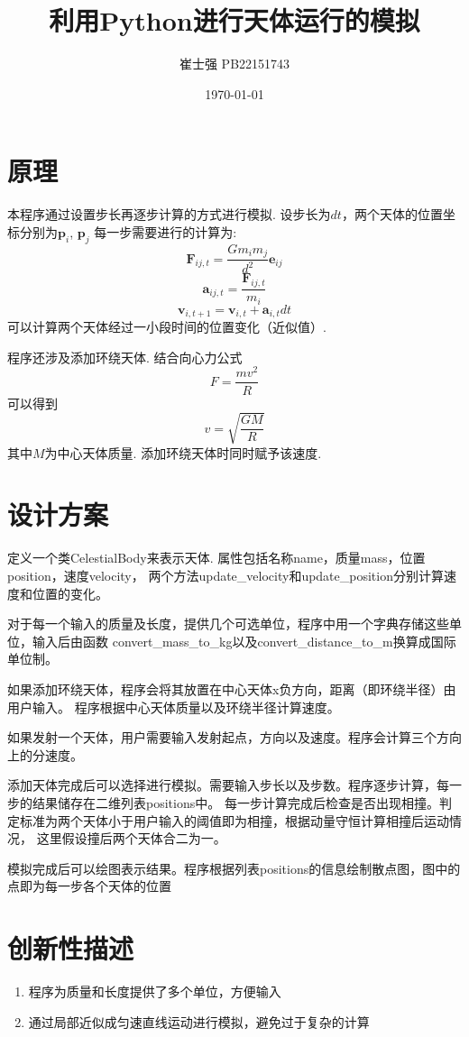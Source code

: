 \documentclass[UTF8]{ctexart}
\title{利用Python进行天体运行的模拟}
\author{崔士强 PB22151743}
\date{\today}
\begin{document}
\maketitle
\section{原理}
本程序通过设置步长再逐步计算的方式进行模拟. 设步长为$dt$，两个天体的位置坐标分别为$\mathbf{p}_i$, $\mathbf{p}_j$
每一步需要进行的计算为:
\[\mathbf{F}_{ij,t}=\frac{Gm_im_j}{d^2}\mathbf{e}_{ij}\]
\[\mathbf{a}_{ij,t}=\frac{\mathbf{F}_{ij,t}}{m_i}\]
\[\mathbf{v}_{i,t+1}=\mathbf{v}_{i,t}+\mathbf{a}_{i,t}dt\]
可以计算两个天体经过一小段时间的位置变化（近似值）.

程序还涉及添加环绕天体. 结合向心力公式
\[F=\frac{mv^2}{R}\]
可以得到
\[v=\sqrt{\frac{GM}{R}}\]
其中$M$为中心天体质量. 添加环绕天体时同时赋予该速度.
\section{设计方案}
定义一个类CelestialBody来表示天体. 属性包括名称name，质量mass，位置position，速度velocity，
两个方法update\_velocity和update\_position分别计算速度和位置的变化。

对于每一个输入的质量及长度，提供几个可选单位，程序中用一个字典存储这些单位，输入后由函数
convert\_mass\_to\_kg以及convert\_distance\_to\_m换算成国际单位制。

如果添加环绕天体，程序会将其放置在中心天体x负方向，距离（即环绕半径）由用户输入。
程序根据中心天体质量以及环绕半径计算速度。

如果发射一个天体，用户需要输入发射起点，方向以及速度。程序会计算三个方向上的分速度。

添加天体完成后可以选择进行模拟。需要输入步长以及步数。程序逐步计算，每一步的结果储存在二维列表positions中。
每一步计算完成后检查是否出现相撞。判定标准为两个天体小于用户输入的阈值即为相撞，根据动量守恒计算相撞后运动情况，
这里假设撞后两个天体合二为一。

模拟完成后可以绘图表示结果。程序根据列表positions的信息绘制散点图，图中的点即为每一步各个天体的位置
\section{创新性描述}
\begin{enumerate}
  \item 程序为质量和长度提供了多个单位，方便输入
  \item 通过局部近似成匀速直线运动进行模拟，避免过于复杂的计算
\end{enumerate}
\end{document}
